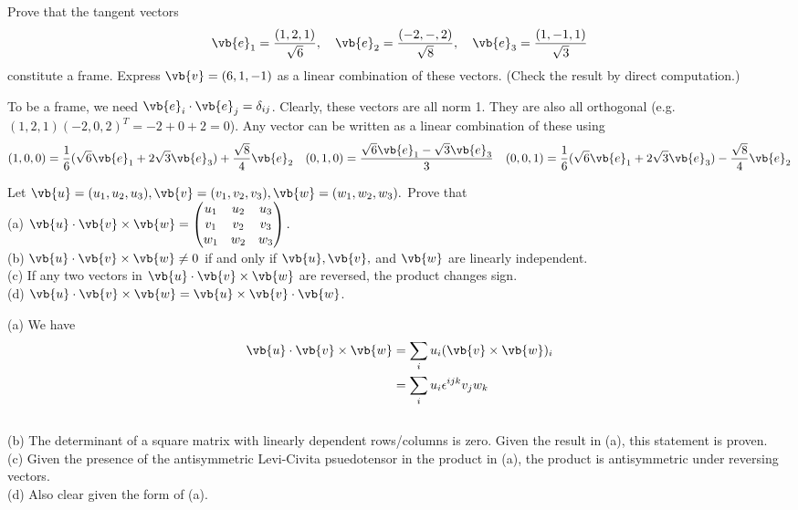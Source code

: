 \begin{problem}{3}
  Prove that the tangent vectors
  \begin{equation}
    \vb{e}_1=\frac{(1,2,1)}{\sqrt{6}},\quad\vb{e}_2=\frac{(-2,-,2)}{\sqrt{8}},\quad\vb{e}_3=\frac{(1,-1,1)}{\sqrt{3}}
  \end{equation}
  constitute a frame. Express \(\vb{v} = (6, 1, -1)\) as a linear combination of these vectors. (Check the result by direct computation.)
\end{problem}
\begin{sol}
  To be a frame, we need \(\vb{e}_i\cdot\vb{e}_j=\delta_{ij}\). Clearly, these vectors are all norm 1. They are also all orthogonal (e.g. \((1,2,1)(-2,0,2)^{T}=-2+0+2=0\)). Any vector can be written as a linear combination of these using
  \begin{equation}
    (1,0,0)=\frac{1}{6}(\sqrt{6}\vb{e}_1+2\sqrt{3}\vb{e}_3)+\frac{\sqrt{8}}{4}\vb{e}_2\quad(0,1,0)=\frac{\sqrt{6}\vb{e}_1-\sqrt{3}\vb{e}_3}{3}\quad(0,0,1)=\frac{1}{6}(\sqrt{6}\vb{e}_1+2\sqrt{3}\vb{e}_3)-\frac{\sqrt{8}}{4}\vb{e}_2
  \end{equation}
\end{sol}

\begin{problem}{4}
  Let \(\vb{u} = (u_1, u_2, u_3), \vb{v} = (v_1, v_2, v_3), \vb{w} = (w_1, w_2, w_3).\) Prove that\\
  (a) \(\vb{u}\cdot\vb{v}\times\vb{w}=\begin{pmatrix}
  u_1 & u_2 & u_3\\
  v_1 & v_2 & v_3\\
  w_1 & w_2 & w_3
  \end{pmatrix}.\)\\
  (b) \(\vb{u}\cdot\vb{v}\times\vb{w}\neq 0\) if and only if \(\vb{u}, \vb{v},\) and \(\vb{w}\) are linearly independent.\\
  (c) If any two vectors in \(\vb{u}\cdot\vb{v}\times\vb{w}\) are reversed, the product changes sign.\\
  (d) \(\vb{u}\cdot\vb{v}\times\vb{w} = \vb{u}\times\vb{v}\cdot\vb{w}\).
\end{problem}
\begin{sol}
  (a) We have
  \begin{align}
    \vb{u}\cdot\vb{v}\times\vb{w}&=\sum_i u_i(\vb{v}\times\vb{w})_i\\
    &=\sum_i u_i \epsilon^{ijk}v_j w_k
  \end{align}\\
  (b) The determinant of a square matrix with linearly dependent rows/columns is zero. Given the result in (a), this statement is proven.\\
  (c) Given the presence of the antisymmetric Levi-Civita psuedotensor in the product in (a), the product is antisymmetric under reversing vectors.\\
  (d) Also clear given the form of (a).
\end{sol}

